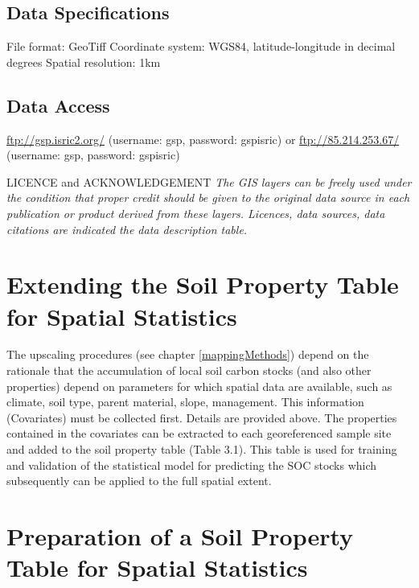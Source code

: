 \documentclass[10pt,b5paper,]{book}
\theoremstyle{definition}
\theoremstyle{definition}
\theoremstyle{definition}
\theoremstyle{remark}
\begin{document}
\hypertarget{data-specifications}{%
\subsection{Data Specifications}\label{data-specifications}}

File format: GeoTiff Coordinate system: WGS84, latitude-longitude in
decimal degrees Spatial resolution: 1km

\hypertarget{data-access}{%
\subsection{Data Access}\label{data-access}}

\url{ftp://gsp.isric2.org/} (username: gsp, password: gspisric) or
\url{ftp://85.214.253.67/} (username: gsp, password: gspisric)

LICENCE and ACKNOWLEDGEMENT \emph{The GIS layers can be freely used
under the condition that proper credit should be given to the original
data source in each publication or product derived from these layers.
Licences, data sources, data citations are indicated the data
description table.}

\hypertarget{extending-the-soil-property-table-for-spatial-statistics}{%
\section{Extending the Soil Property Table for Spatial
Statistics}\label{extending-the-soil-property-table-for-spatial-statistics}}

The upscaling procedures (see chapter \ref{mappingMethods}) depend on
the rationale that the accumulation of local soil carbon stocks (and
also other properties) depend on parameters for which spatial data are
available, such as climate, soil type, parent material, slope,
management. This information (Covariates) must be collected first.
Details are provided above. The properties contained in the covariates
can be extracted to each georeferenced sample site and added to the soil
property table (Table 3.1). This table is used for training and
validation of the statistical model for predicting the SOC stocks which
subsequently can be applied to the full spatial extent.

\hypertarget{preparation-of-a-soil-property-table-for-spatial-statistics}{%
\section{Preparation of a Soil Property Table for Spatial
Statistics}\label{preparation-of-a-soil-property-table-for-spatial-statistics}}
\end{document}
